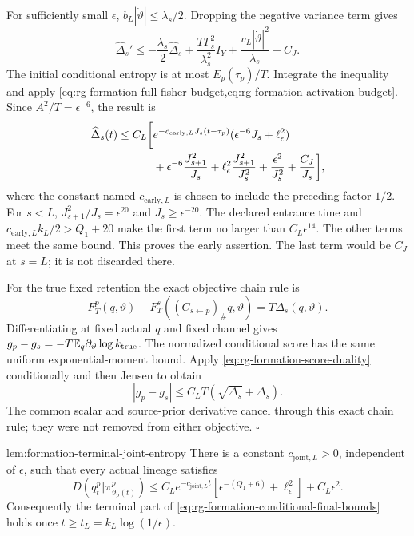 For sufficiently small $\epsilon$,
$b_L|\dot\vartheta|\le\lambda_s/2$. Dropping the negative variance
term gives
\begin{equation}
 \widehat\Delta_s'
 \le-\frac{\lambda_s}{2}\widehat\Delta_s
     +\frac{T\Gamma_s^2}{\lambda_s^2}I_Y
     +\frac{v_L|\dot\vartheta|^2}{\lambda_s}
     +C_J.
 \label{eq:rg-formation-conditional-differential-bound}
\end{equation}
The initial conditional entropy is at most $E_p(\tau_p)/T$.
Integrate the inequality and apply
\cref{eq:rg-formation-full-fisher-budget,eq:rg-formation-activation-budget}.
Since $A^2/T=\epsilon^{-6}$, the result is
\begin{align}
 \widehat\Delta_s(t)\le C_L\bigg[
 &e^{-c_{\mathrm{early},L}J_s(t-\tau_p)}
                 (\epsilon^{-6}J_s+\ell_\epsilon^2)
 \notag\\
 &+\epsilon^{-6}\frac{J_{s+1}^2}{J_s}
 +\ell_\epsilon^2\frac{J_{s+1}^2}{J_s^2}
 +\frac{\epsilon^2}{J_s^2}+\frac{C_J}{J_s}\bigg],
 \label{eq:rg-formation-early-entropy-bound}
\end{align}
where the constant named $c_{\mathrm{early},L}$ is chosen to include
the preceding factor $1/2$. For $s<L$,
$J_{s+1}^2/J_s=\epsilon^{20}$ and $J_s\ge\epsilon^{-20}$.
The declared entrance time and
$c_{\mathrm{early},L}k_L/2>Q_1+20$ make the first term no larger
than $C_L\epsilon^{14}$. The other terms meet the same bound.
This proves the early assertion. The last term would be $C_J$ at
$s=L$; it is not discarded there.

For the true fixed retention the exact objective chain rule is
\begin{equation}
 F_T^p(q,\vartheta)
 -F_T^s((C_{s\leftarrow p})_\#q,\vartheta)
 =T\Delta_s(q,\vartheta).
 \label{eq:rg-formation-objective-chain-proof}
\end{equation}
Differentiating at fixed actual $q$ and fixed channel gives
$g_p-g_s=-T\mathbb E_q\partial_\vartheta\log k_{\mathrm{true}}$.
The normalized conditional score has the same uniform
exponential-moment bound. Apply
\cref{eq:rg-formation-score-duality} conditionally and then Jensen
to obtain
\begin{equation}
 |g_p-g_s|
 \le C_LT(\sqrt{\Delta_s}+\Delta_s).
 \label{eq:rg-formation-complete-score-error}
\end{equation}
The common scalar and source-prior derivative cancel through this
exact chain rule; they were not removed from either objective.
\hfill$\square$

{lem:formation-terminal-joint-entropy}
There is a constant $c_{\mathrm{joint},L}>0$, independent of
$\epsilon$, such that every actual lineage satisfies
\begin{equation}
 D(q_t^p\Vert\pi_{\vartheta_p(t)}^p)
 \le C_L e^{-c_{\mathrm{joint},L}t}
           [\epsilon^{-(Q_1+6)}+\ell_\epsilon^2]
       +C_L\epsilon^2.
 \label{eq:rg-formation-terminal-joint-bound}
\end{equation}
Consequently the terminal part of
\cref{eq:rg-formation-conditional-final-bounds} holds once
$t\ge t_L=k_L\log(1/\epsilon)$. 

